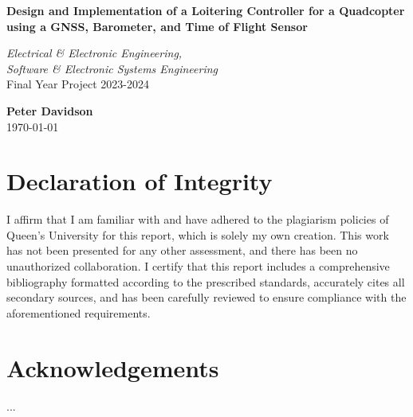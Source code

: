 \documentclass{article}
\begin{document}
\onehalfspacing

\begin{titlepage}
    \begin{center}
        
        \textbf{\Large Design and Implementation of a Loitering Controller for a Quadcopter using a GNSS, Barometer, and Time of Flight Sensor}\\
        \vspace{1.5cm} 
        
        \textit{\large Electrical \& Electronic Engineering, \\ Software \& Electronic Systems Engineering}\\
        \vspace{0.5cm} 
        Final Year Project 2023-2024\\
        \vspace{2cm} 
        
        \textbf{Peter Davidson}\\
        \vspace{0.5cm} 
        \today
        
        \vfill
        
    \end{center}
    \thispagestyle{fancy}
\end{titlepage}
 
\newpage
\pagestyle{plain} %

\section*{Declaration of Integrity}
I affirm that I am familiar with and have adhered to the plagiarism policies of Queen's University for this report, which is solely 
my own creation. This work has not been presented for any other assessment, and there has been no unauthorized collaboration. 
I certify that this report includes a comprehensive bibliography formatted according to the prescribed standards, accurately 
cites all secondary sources, and has been carefully reviewed to ensure compliance with the aforementioned requirements.
\newpage

\section*{Acknowledgements}
...
\newpage
\end{document}
